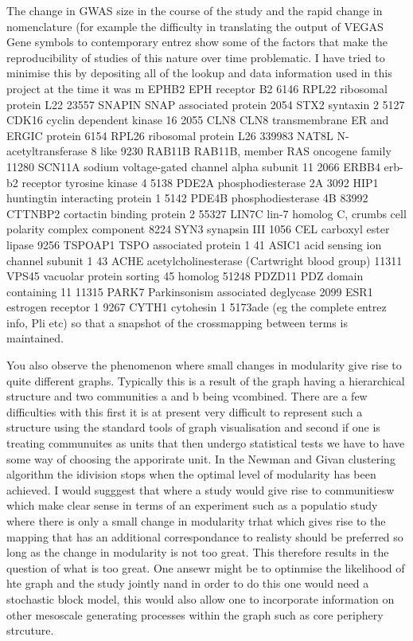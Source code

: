 The change in GWAS size in the course of the study and the rapid change in nomenclature (for example the difficulty in translating the output of VEGAS Gene symbols to contemporary entrez show some of the factors that make the reproducibility of studies of this nature over time problematic. I have tried to minimise this by depositing all of the lookup and data information used in this project at the time it was m	EPHB2	EPH receptor B2
6146	RPL22	ribosomal protein L22
23557	SNAPIN	SNAP associated protein
2054	STX2	syntaxin 2
5127	CDK16	cyclin dependent kinase 16
2055	CLN8	CLN8 transmembrane ER and ERGIC protein
6154	RPL26	ribosomal protein L26
339983	NAT8L	N-acetyltransferase 8 like
9230	RAB11B	RAB11B, member RAS oncogene family
11280	SCN11A	sodium voltage-gated channel alpha subunit 11
2066	ERBB4	erb-b2 receptor tyrosine kinase 4
5138	PDE2A	phosphodiesterase 2A
3092	HIP1	huntingtin interacting protein 1
5142	PDE4B	phosphodiesterase 4B
83992	CTTNBP2	cortactin binding protein 2
55327	LIN7C	lin-7 homolog C, crumbs cell polarity complex component
8224	SYN3	synapsin III
1056	CEL	carboxyl ester lipase
9256	TSPOAP1	TSPO associated protein 1
41	ASIC1	acid sensing ion channel subunit 1
43	ACHE	acetylcholinesterase (Cartwright blood group)
11311	VPS45	vacuolar protein sorting 45 homolog
51248	PDZD11	PDZ domain containing 11
11315	PARK7	Parkinsonism associated deglycase
2099	ESR1	estrogen receptor 1
9267	CYTH1	cytohesin 1
5173ade (eg the complete entrez info, Pli etc) so that a snapshot of the crossmapping between terms is maintained. 

You also observe the phenomenon where small changes in modularity give rise to quite different graphs. Typically this is a result of the graph having a hierarchical structure and two communities a and b being vcombined. There are a few difficulties with this first it is at present very difficult to represent such a structure using the standard tools of graph visualisation and second if one is treating communuites as units that then undergo statistical tests we have to have some way of choosing the apporirate unit. In the Newman and Givan clustering algorithm the idivision stops when the optimal level of modularity has been achieved. I would sugggest that where a study would give rise to communitiesw which make clear sense in terms of an experiment such as a populatio study where there is only a small change in modularity trhat which gives rise to the mapping that has an additional correspondance to realisty should be preferred so long as the change in modularity is not too great. This therefore results in the question of what is too great. One ansewr might be to optinmise the likelihood of hte graph and the study jointly nand in order to do this one would need a stochastic block model, this would also allow one to incorporate information on other mesoscale generating processes within the graph such as core periphery strcuture.


